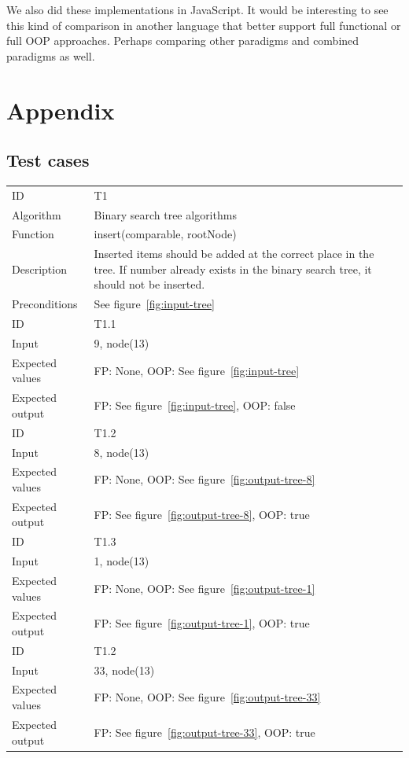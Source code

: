 \documentclass {article}
\begin{document}
We also did these implementations in JavaScript. It would be interesting to see this kind of comparison in another language that better support full functional or full OOP approaches. Perhaps comparing other paradigms and combined paradigms as well.



\appendix
\section{Appendix}
\label{appendix:test-cases}
\subsection{Test cases}
\begin{tabular}{ | l p{10cm} | }
\hline
ID & T1 \\
Algorithm & Binary search tree algorithms \\
Function & insert(comparable, rootNode) \\
Description & Inserted items should be added at the correct place in the tree. If number already exists in the binary search tree, it should not be inserted. \\
Preconditions & See figure~\ref{fig:input-tree} \\
\hline
ID & T1.1 \\
Input & 9, node(13) \\
Expected values & FP: None, OOP: See figure~\ref{fig:input-tree} \\
Expected output & FP: See figure~\ref{fig:input-tree}, OOP: false \\
\hline
ID & T1.2 \\
Input & 8, node(13) \\
Expected values & FP: None, OOP: See figure~\ref{fig:output-tree-8} \\
Expected output & FP: See figure~\ref{fig:output-tree-8}, OOP: true \\
\hline
ID & T1.3 \\
Input & 1, node(13) \\
Expected values & FP: None, OOP: See figure~\ref{fig:output-tree-1} \\
Expected output & FP: See figure~\ref{fig:output-tree-1}, OOP: true \\
\hline
ID & T1.2 \\
Input & 33, node(13) \\
Expected values & FP: None, OOP: See figure~\ref{fig:output-tree-33} \\
Expected output & FP: See figure~\ref{fig:output-tree-33}, OOP: true \\
\hline
\end{tabular}
\end{document}
